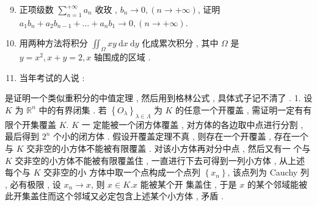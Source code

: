 \documentclass[10pt]{article}
\begin{document}
\begin{enumerate}
  \setcounter{enumi}{8}
  \item  正项级数  $\sum_{n=1}^{+\infty} a_{n}$  收玫 , $b_{n} \rightarrow 0,(n \rightarrow+\infty)$,  证明  $a_{1} b_{n}+a_{2} b_{n-1}+\ldots+a_{n} b_{1} \rightarrow 0,(n \rightarrow+\infty)$.

  \item  用两种方法将积分  $\iint_{\Omega} x y \mathrm{~d} x \mathrm{~d} y$  化成累次积分 ,  其中  $\Omega$  是  $y=x^{2}, x+y=2, x$  轴围成的区域 .

  \item  当年考试的人说 :

\end{enumerate}
 是证明一个类似重积分的中值定理 ,  然后用到格林公式 ,  具体式子记不清了 . 1.  设  $K$  为  $\mathbb{R}^{n}$  中的有界闭集 .  若  $\left\{O_{\lambda}\right\}_{\lambda \in \Lambda}$  为  $K$  的任意一个开覆盖 ,  需证明一定有有限个开集覆盖  $K$. $K$  一   定能被一个闭方体覆盖 ,  对方体的各边取中点进行分割 ,  最后得到  $2^{n}$  个小的闭方体 .  假设开覆盖定理不真 ,  则存在一个开覆盖 ,  存在一个与  $K$  交非空的小方体不能被有限覆盖 .  对该小方体再对分中点 ,  然后又有一   个与  $K$  交非空的小方体不能被有限覆盖住 , 一直进行下去可得到一列小方体 ,  从上述每个与  $K$  交非空的小   方体中取一个点构成一个点列  $\left\{x_{n}\right\}$,  该点列为  Cauchy  列 ,  必有极限 ,  设  $x_{n} \rightarrow x$,  则  $x \in K . x$  能被某个开   集盖住 ,  于是  $x$  的某个邻域能被此开集盖住而这个邻域又必定包含上述某个小方体 ,  矛盾 .
\end{document}
